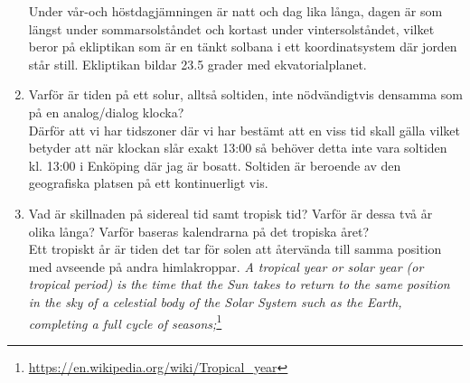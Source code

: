 \documentclass[./exercises.tex]{subfiles}
\begin{document}
\begin{enumerate}
Under vår-och höstdagjämningen är natt och dag lika långa, dagen är som längst under sommarsolståndet och kortast
under vintersolståndet, vilket beror på ekliptikan som är en tänkt solbana i ett koordinatsystem där jorden står still.
Ekliptikan bildar 23.5 grader med ekvatorialplanet.

\item Varför är tiden på ett solur, alltså soltiden, inte nödvändigtvis densamma som på en
analog/dialog klocka?\\

Därför att vi har tidszoner där vi har bestämt att en viss tid skall gälla vilket betyder att när klockan slår exakt 13:00
så behöver detta inte vara soltiden kl. 13:00 i Enköping där jag är bosatt. Soltiden är beroende av den geografiska platsen
på ett kontinuerligt vis.

\item Vad är skillnaden på sidereal tid samt tropisk tid? Varför är dessa två år olika långa? Varför
baseras kalendrarna på det tropiska året?\\

Ett tropiskt år är tiden det tar för solen att återvända till samma position med avseende på andra himlakroppar.
\textit{A tropical year or solar year (or tropical period) is the time that the Sun takes to return to the same position in the sky of a celestial body of the Solar System such as the Earth, completing a full cycle of seasons;}\footnote{\url{https://en.wikipedia.org/wiki/Tropical_year}} 


\end{enumerate}
\end{document}
